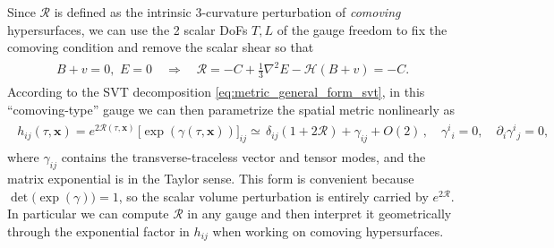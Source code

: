 Since $\mathcal{R}$ is defined as the intrinsic 3-curvature perturbation of \emph{comoving} hypersurfaces, we can use the 2 scalar DoFs $T,L$ of the gauge freedom to fix the comoving condition and remove the scalar shear so that
\begin{align}
\begin{aligned}
    B+v=0, \,\, E=0\quad \Rightarrow\quad \mathcal{R}=-C+\frac{1}{3}\nabla^2 E-\mathcal{H}(B+v)=-C.
\end{aligned}
\end{align}
According to the SVT decomposition \eqref{eq:metric_general_form_svt}, in this ``comoving-type'' gauge we can then parametrize the spatial metric nonlinearly as
{\small\begin{align}
\begin{aligned}
    h_{ij}(\tau,\mathbf{x})
    =
    e^{2\mathcal{R}(\tau,\mathbf{x})}\,\big[\exp(\gamma(\tau,\mathbf{x}))\big]_{ij} \simeq\, \delta_{ij} (1+2\mathcal{R})+ \gamma_{ij}+O(2)\,,
    \quad
    \gamma^i{}_i=0,
    \quad
    \partial_i\gamma^i{}_j=0,
\end{aligned}
\end{align}}
where $\gamma_{ij}$ contains the transverse-traceless vector and tensor modes, and the matrix exponential is in the Taylor sense.
This form is convenient because $\det\!\big(\exp(\gamma)\big)=1$, so the scalar volume perturbation is entirely carried by $e^{2\mathcal{R}}$.
In particular we can compute $\mathcal{R}$ in any gauge and then interpret it geometrically through the exponential factor in $h_{ij}$ when working on comoving hypersurfaces.






